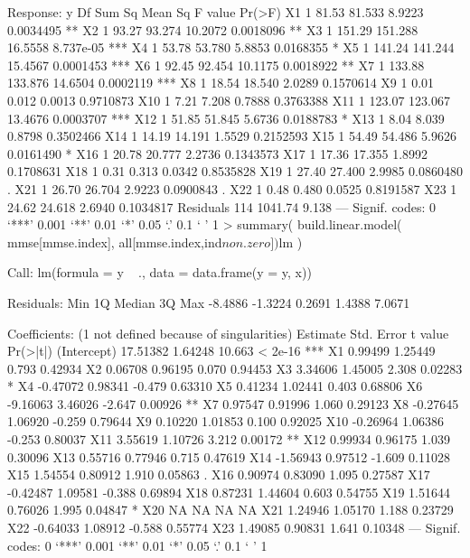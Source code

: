 Response: y
           Df  Sum Sq Mean Sq F value    Pr(>F)    
X1          1   81.53  81.533  8.9223 0.0034495 ** 
X2          1   93.27  93.274 10.2072 0.0018096 ** 
X3          1  151.29 151.288 16.5558 8.737e-05 ***
X4          1   53.78  53.780  5.8853 0.0168355 *  
X5          1  141.24 141.244 15.4567 0.0001453 ***
X6          1   92.45  92.454 10.1175 0.0018922 ** 
X7          1  133.88 133.876 14.6504 0.0002119 ***
X8          1   18.54  18.540  2.0289 0.1570614    
X9          1    0.01   0.012  0.0013 0.9710873    
X10         1    7.21   7.208  0.7888 0.3763388    
X11         1  123.07 123.067 13.4676 0.0003707 ***
X12         1   51.85  51.845  5.6736 0.0188783 *  
X13         1    8.04   8.039  0.8798 0.3502466    
X14         1   14.19  14.191  1.5529 0.2152593    
X15         1   54.49  54.486  5.9626 0.0161490 *  
X16         1   20.78  20.777  2.2736 0.1343573    
X17         1   17.36  17.355  1.8992 0.1708631    
X18         1    0.31   0.313  0.0342 0.8535828    
X19         1   27.40  27.400  2.9985 0.0860480 .  
X21         1   26.70  26.704  2.9223 0.0900843 .  
X22         1    0.48   0.480  0.0525 0.8191587    
X23         1   24.62  24.618  2.6940 0.1034817    
Residuals 114 1041.74   9.138                      
---
Signif. codes:  0 ‘***’ 0.001 ‘**’ 0.01 ‘*’ 0.05 ‘.’ 0.1 ‘ ’ 1
> summary(  build.linear.model( mmse[mmse.index], all[mmse.index,ind$non.zero])$lm )

Call:
lm(formula = y ~ ., data = data.frame(y = y, x))

Residuals:
    Min      1Q  Median      3Q     Max 
-8.4886 -1.3224  0.2691  1.4388  7.0671 

Coefficients: (1 not defined because of singularities)
            Estimate Std. Error t value Pr(>|t|)    
(Intercept) 17.51382    1.64248  10.663  < 2e-16 ***
X1           0.99499    1.25449   0.793  0.42934    
X2           0.06708    0.96195   0.070  0.94453    
X3           3.34606    1.45005   2.308  0.02283 *  
X4          -0.47072    0.98341  -0.479  0.63310    
X5           0.41234    1.02441   0.403  0.68806    
X6          -9.16063    3.46026  -2.647  0.00926 ** 
X7           0.97547    0.91996   1.060  0.29123    
X8          -0.27645    1.06920  -0.259  0.79644    
X9           0.10220    1.01853   0.100  0.92025    
X10         -0.26964    1.06386  -0.253  0.80037    
X11          3.55619    1.10726   3.212  0.00172 ** 
X12          0.99934    0.96175   1.039  0.30096    
X13          0.55716    0.77946   0.715  0.47619    
X14         -1.56943    0.97512  -1.609  0.11028    
X15          1.54554    0.80912   1.910  0.05863 .  
X16          0.90974    0.83090   1.095  0.27587    
X17         -0.42487    1.09581  -0.388  0.69894    
X18          0.87231    1.44604   0.603  0.54755    
X19          1.51644    0.76026   1.995  0.04847 *  
X20               NA         NA      NA       NA    
X21          1.24946    1.05170   1.188  0.23729    
X22         -0.64033    1.08912  -0.588  0.55774    
X23          1.49085    0.90831   1.641  0.10348    
---
Signif. codes:  0 ‘***’ 0.001 ‘**’ 0.01 ‘*’ 0.05 ‘.’ 0.1 ‘ ’ 1

